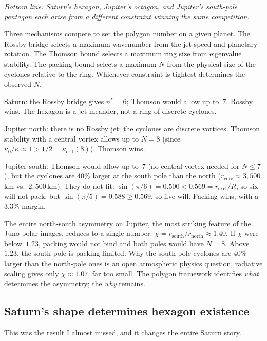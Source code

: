 \medskip

\noindent\textit{Bottom line: Saturn's hexagon, Jupiter's octagon, and
Jupiter's south-pole pentagon each arise from a different constraint
winning the same competition.}

\medskip

Three mechanisms compete to set the polygon number on a given planet.
The Rossby bridge selects a maximum wavenumber from the jet
speed and planetary rotation.
The Thomson bound selects a maximum ring size from
eigenvalue stability.
The packing bound selects a maximum $N$ from the physical
size of the cyclones relative to the ring.
Whichever constraint is tightest determines the observed $N$.

Saturn: the Rossby bridge gives $n^* = 6$; Thomson would allow
up to~$7$.  Rossby wins.  The hexagon is a jet meander, not a
ring of discrete cyclones.

Jupiter north: there is no Rossby jet; the cyclones are
discrete vortices.  Thomson stability with a central vortex
allows up to $N = 8$ (since $\kappa_0/\kappa \approx 1 > 1/2
= \kappa_{\mathrm{crit}}(8)$).  Thomson wins.

Jupiter south: Thomson would allow up to~$7$ (no central vortex
needed for $N \le 7$), but the cyclones are $40\%$
larger at the south pole than the north ($r_{\mathrm{core}}
\approx 3{,}500$\,km vs.\ $2{,}500$\,km).
They do not fit: $\sin(\pi/6) = 0.500 < 0.569
= r_{\mathrm{excl}}/R$, so six will not pack; but
$\sin(\pi/5) = 0.588 \ge 0.569$, so five will.
Packing wins, with a $3.3\%$ margin.

The entire north-south asymmetry on Jupiter, the most
striking feature of the Juno polar images, reduces to a
single number: $\chi = r_{\mathrm{south}}/r_{\mathrm{north}}
\approx 1.40$.  If $\chi$ were below~$1.23$, packing would not
bind and both poles would have $N = 8$.  Above~$1.23$, the
south pole is packing-limited.  Why the south-pole cyclones are
$40\%$ larger than the north-pole ones is an open atmospheric
physics question, radiative scaling gives only $\chi \approx
1.07$, far too small.  The polygon framework identifies
\emph{what} determines the asymmetry; the \emph{why} remains.

\subsection*{Saturn's shape determines hexagon existence}

This was the result I almost missed, and it changes the
entire Saturn story.

